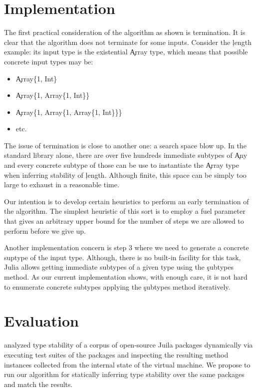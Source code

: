 \documentclass[sigplan,review,anonymous]{acmart}
\begin{document}
\section{Implementation}%
\label{sec:impl}

The first practical consideration of the algorithm as shown is termination. It
is clear that the algorithm does not terminate for some inputs. Consider the
\c{length} example: its input type is the existential \c{Array} type, which
means that possible concrete input types may be:
\begin{itemize}

  \item \c{Array\{1, Int\}}
  \item \c{Array\{1, Array\{1, Int\}\}}
  \item \c{Array\{1, Array\{1, Array\{1, Int\}\}\}}
  \item etc.
\end{itemize}

The issue of termination is close to another one: a search space blow up.
In the standard library alone, there are over five hundreds immediate subtypes
of \c{Any} and every concrete subtype of those can be use to instantiate the
\c{Array} type when inferring stability of \c{length}. Although finite, this
space can be simply too large to exhaust in a reasonable time.

Our intention is to develop certain heuristics to perform an early termination
of the algorithm. The simplest heuristic of this sort is to employ a fuel
parameter that gives an arbitrary upper bound for the number of steps we are
allowed to perform before we give up.

Another implementation concern is step 3 where we need to generate a concrete
suptype of the input type. Although, there is no built-in facility for this
task, Julia allows getting immediate subtypes of a given type using the
\c{subtypes} method. As our current implementation shows, with enough care, it
is not hard to enumerate concrete subtypes applying the \c{subtypes} method
iteratively.

\section{Evaluation}%
\label{sec:eval}

\citet{Pelenitsyn21} analyzed type stability of a corpus of open-source Juila
packages dynamically via executing test suites of the packages and inspecting the
resulting method instances collected from the internal state of the virtual
machine. We propose to run our algorithm for statically inferring type stability
over the same packages and match the results.



\end{document}
